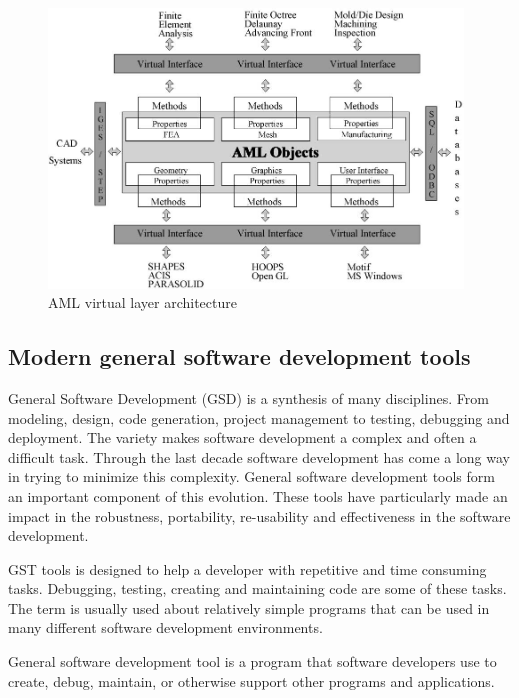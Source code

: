 \begin{figure}[ht!]
\centering
\includegraphics[width=110mm]{gfx/aml_program_structure.png}

\caption{AML virtual layer architecture \citep{AML}}
\label{fig:aml}
\end{figure}


\subsection{Modern general software development tools} %
\label{sub:modern_general_software_development}


General Software Development (GSD) is a synthesis of many disciplines. From modeling, design, code generation, project management to testing, debugging and deployment. The variety makes software development a complex and often a difficult task. Through the last decade software development has come a long way in trying to minimize this complexity. General software development tools form an important component of this evolution. These tools have particularly made an impact in the robustness, portability, re-usability and effectiveness in the software development.

GST tools is designed to help a developer with repetitive and time consuming tasks. Debugging, testing, creating and maintaining code are some of these tasks. The term is usually used about relatively simple programs that can be used in many different software development environments.

 \begin{mydef}
  \label{def:GST}
  General software development tool is a program that software developers use to create, debug, maintain, or otherwise support other programs and applications.
\end{mydef}


